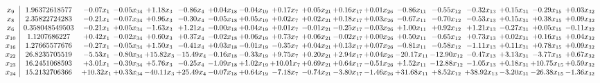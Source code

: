 \documentclass[9pt]{article}
\begin{document}
 \[\begin{array}{c| c c@{\hskip 2pt} c@{\hskip 2pt} c@{\hskip 2pt} c@{\hskip 2pt} c@{\hskip 2pt} c@{\hskip 2pt} c@{\hskip 2pt} c@{\hskip 2pt} c@{\hskip 2pt} c@{\hskip 2pt} c@{\hskip 2pt} c@{\hskip 2pt} c@{\hskip 2pt} c@{\hskip 2pt} c@{\hskip 2pt} c@{\hskip 2pt} }
 x_{9}   &  1.96372618577 & -0.07 x_{1} & -0.05 x_{34} & +  1.18 x_{3} & -0.86 x_{4} & +  0.04 x_{18} & -0.04 x_{19} & +  0.17 x_{7} & +  0.05 x_{21} & +  0.16 x_{17} & +  0.01 x_{26} & -0.86 x_{11} & -0.55 x_{12} & -0.32 x_{13} & +  0.15 x_{31} & -0.29 x_{15} & +  0.03 x_{32}\\
 x_{8}   &  2.35822724283 & -0.21 x_{1} & -0.07 x_{34} & +  0.96 x_{3} & -0.30 x_{4} & -0.05 x_{18} & +  0.05 x_{19} & +  0.02 x_{7} & +  0.02 x_{21} & +  0.18 x_{17} & +  0.03 x_{26} & -0.67 x_{11} & -0.70 x_{12} & -0.53 x_{13} & +  0.15 x_{31} & +  0.38 x_{15} & +  0.09 x_{32}\\
 x_{6}   &  0.358048549503 & -0.21 x_{1} & +  0.05 x_{34} & -1.63 x_{3} & +  1.21 x_{4} & -0.00 x_{18} & +  0.04 x_{19} & +  0.01 x_{7} & -0.01 x_{21} & -0.25 x_{17} & -0.03 x_{26} & +  1.00 x_{11} & +  0.92 x_{12} & +  1.21 x_{13} & -0.27 x_{31} & +  0.05 x_{15} & -0.11 x_{32}\\
 x_{10}   &  1.1207686227 & +  0.42 x_{1} & -0.02 x_{34} & +  0.60 x_{3} & +  0.37 x_{4} & -0.02 x_{18} & +  0.06 x_{19} & +  0.73 x_{7} & +  0.06 x_{21} & -0.02 x_{17} & +  0.00 x_{26} & +  0.50 x_{11} & -0.65 x_{12} & +  0.73 x_{13} & +  0.02 x_{31} & +  0.16 x_{15} & +  0.04 x_{32}\\
 x_{16}   &  1.27665577676 & -0.27 x_{1} & -0.05 x_{34} & +  1.50 x_{3} & -0.41 x_{4} & +  0.03 x_{18} & -0.01 x_{19} & -0.35 x_{7} & +  0.04 x_{21} & +  0.13 x_{17} & +  0.07 x_{26} & -0.81 x_{11} & -0.58 x_{12} & -1.11 x_{13} & +  0.11 x_{31} & +  0.78 x_{15} & +  0.09 x_{32}\\
 x_{22}   &  26.8235705519 & -5.53 x_{1} & -0.80 x_{34} & + 15.82 x_{3} & -15.49 x_{4} & -0.16 x_{18} & -0.33 x_{19} & +  9.75 x_{7} & +  0.20 x_{21} & +  2.94 x_{17} & +  0.04 x_{26} & -20.17 x_{11} & -12.90 x_{12} & -0.47 x_{13} & +  3.13 x_{31} & -3.77 x_{15} & +  0.67 x_{32}\\
 x_{23}   &  16.2451068593 & +  3.01 x_{1} & -0.39 x_{34} & +  5.76 x_{3} & -0.25 x_{4} & -1.09 x_{18} & +  1.02 x_{19} & + 10.01 x_{7} & +  0.69 x_{21} & +  0.64 x_{17} & -0.51 x_{26} & +  1.52 x_{11} & -12.88 x_{12} & -1.05 x_{13} & +  0.18 x_{31} & + 10.75 x_{15} & +  0.59 x_{32}\\
 x_{24}   &  15.2132706366 & + 10.32 x_{1} & +  0.33 x_{34} & -40.11 x_{3} & + 25.49 x_{4} & -0.07 x_{18} & +  0.64 x_{19} & -7.18 x_{7} & -0.74 x_{21} & -3.80 x_{17} & -1.46 x_{26} & + 31.68 x_{11} & +  8.52 x_{12} & + 38.92 x_{13} & -3.20 x_{31} & -26.38 x_{15} & -1.36 x_{32}\\

\end{array}\]
\end{document}
